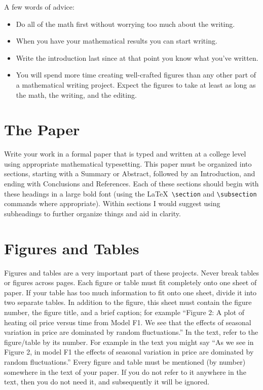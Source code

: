 \documentclass[
]{book}
\theoremstyle{definition}
\theoremstyle{definition}
\theoremstyle{definition}
\theoremstyle{remark}
\begin{document}
A few words of advice:

\begin{itemize}
\item
  Do all of the math first without worrying too much about the
  writing.
\item
  When you have your mathematical results you can start writing.
\item
  Write the introduction last since at that point you know what you've
  written.
\item
  You will spend more time creating well-crafted figures than any
  other part of a mathematical writing project. Expect the figures to
  take at least as long as the math, the writing, and the editing.
\end{itemize}

\hypertarget{the-paper}{%
\section{The Paper}\label{the-paper}}

Write your work in a formal paper that is typed and written at a college
level using appropriate mathematical typesetting. This paper must be
organized into sections, starting with a Summary or Abstract, followed
by an Introduction, and ending with Conclusions and References. Each of
these sections should begin with these headings in a large bold font
(using the LaTeX~\texttt{\textbackslash{}section} and \texttt{\textbackslash{}subsection} commands where
appropriate). Within sections I would suggest using subheadings to
further organize things and aid in clarity.

\hypertarget{figures-and-tables}{%
\section{Figures and Tables}\label{figures-and-tables}}

Figures and tables are a very important part of these projects. Never
break tables or figures across pages. Each figure or table must fit
completely onto one sheet of paper. If your table has too much
information to fit onto one sheet, divide it into two separate tables.
In addition to the figure, this sheet must contain the figure number,
the figure title, and a brief caption; for example ``Figure 2: A plot of
heating oil price versus time from Model F1. We see that the effects of
seasonal variation in price are dominated by random fluctuations.'' In
the text, refer to the figure/table by its number. For example in the
text you might say ``As we see in Figure 2, in model F1 the effects of
seasonal variation in price are dominated by random fluctuations.'' Every
figure and table must be mentioned (by number) somewhere in the text of
your paper. If you do not refer to it anywhere in the text, then you do
not need it, and subsequently it will be ignored.
\end{document}
